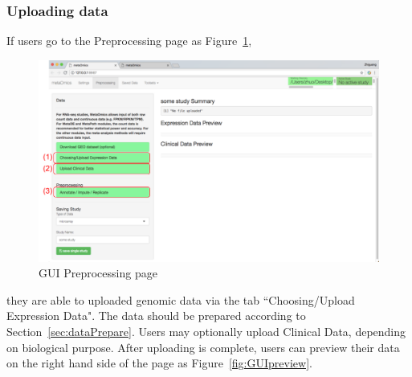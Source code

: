 \subsubsection{Uploading data}
If users go to the Preprocessing page as Figure~\ref{fig:GUIpreprocessing},
\begin{figure}[!htbp]
\begin{center}
\includegraphics[scale=0.35]{./figure/preprocessing/GUIpreprocessing}
\caption{GUI Preprocessing page}
\label{fig:GUIpreprocessing}
\end{center}
\end{figure}
they are able to uploaded genomic data via the tab ``Choosing/Upload Expression Data".
The data should be prepared according to Section~\ref{sec:dataPrepare}.
Users may optionally upload Clinical Data, depending on biological purpose.
After uploading is complete,
users can preview their data on the right hand side of the page as Figure~\ref{fig:GUIpreview}.

